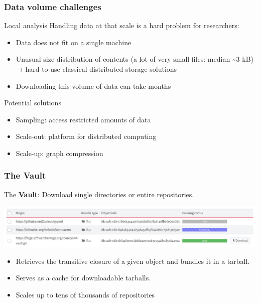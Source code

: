 \documentclass[aspectratio=169,xcolor=table]{beamer}
\begin{document}
    \begin{frame}
        \frametitle{Data volume challenges}

        \begin{block}{Local analysis}
            Handling data at that scale is a hard problem for researchers:
            \begin{itemize}
                \item Data does not fit on a single machine
                \item Unusual size distribution of contents (a lot of very small files: median \textasciitilde{}3 kB) \\
                    → hard to use classical distributed storage solutions
                \item Downloading this volume of data can take months
            \end{itemize}
        \end{block}

        \begin{block}{Potential solutions}
            \begin{itemize}
                \item Sampling: access restricted amounts of data
                \item Scale-out: platform for distributed computing
                \item Scale-up: graph compression
            \end{itemize}
        \end{block}
    \end{frame}

    \begin{frame}
        \frametitle{The Vault}

        \begin{block}{}
            The \textbf{Vault}: Download single directories or entire
            repositories.
        \end{block}

        \begin{center}
            \includegraphics[width=\linewidth]{img/vault.png}
        \end{center}

        \begin{block}{}
            \begin{itemize}
                \item Retrieves the transitive closure of a
                    given object and bundles it in a tarball.
                \item Serves as a cache for downloadable tarballs.
                \item Scales up to tens of thousands of repositories
            \end{itemize}
        \end{block}
    \end{frame}
\end{document}
